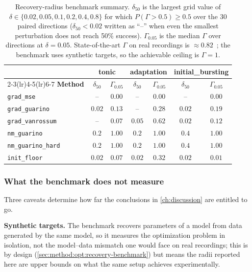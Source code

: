\begin{table}[t]
\centering
\caption{Recovery-radius benchmark summary. $\delta_{50}$ is the largest grid value of $\delta\in\{0.02,0.05,0.1,0.2,0.4,0.8\}$ for which $P(\Gamma>0.5)\geq 0.5$ over the 30 paired directions ($\delta_{50} < 0.02$ written as ``--'' when even the smallest perturbation does not reach 50\% success). $\Gamma_{0.05}$ is the median $\Gamma$ over directions at $\delta=0.05$. State-of-the-art $\Gamma$ on real recordings is $\approx 0.82$~\cite{Jolivet2008}; the benchmark uses synthetic targets, so the achievable ceiling is $\Gamma=1$.}
\label{tab:results-summary}
\small
\begin{tabular}{lcccccc}
\toprule
& \multicolumn{2}{c}{\textbf{tonic}} & \multicolumn{2}{c}{\textbf{adaptation}} & \multicolumn{2}{c}{\textbf{initial\_bursting}} \\
\cmidrule(lr){2-3}\cmidrule(lr){4-5}\cmidrule(lr){6-7}
\textbf{Method} & $\delta_{50}$ & $\Gamma_{0.05}$ & $\delta_{50}$ & $\Gamma_{0.05}$ & $\delta_{50}$ & $\Gamma_{0.05}$ \\
\midrule
\texttt{grad\_mse}         & --     & $0.00$ & --     & $0.00$ & --     & $0.00$ \\
\texttt{grad\_guarino}     & $0.02$ & $0.13$ & --     & $0.28$ & $0.02$ & $0.19$ \\
\texttt{grad\_vanrossum}   & --     & $0.07$ & $0.05$ & $0.62$ & $0.02$ & $0.12$ \\
\texttt{nm\_guarino}       & $0.2$  & $1.00$ & $0.2$  & $1.00$ & $0.4$  & $1.00$ \\
\texttt{nm\_guarino\_hard} & $0.2$  & $1.00$ & $0.2$  & $1.00$ & $0.4$  & $1.00$ \\
\midrule
\texttt{init\_floor}       & $0.02$ & $0.07$ & $0.02$ & $0.32$ & $0.02$ & $0.01$ \\
\bottomrule
\end{tabular}
\end{table}

\subsubsection{What the benchmark does not measure}
Three caveats determine how far the conclusions in \cref{ch:discussion} are entitled to go.

\textbf{Synthetic targets.} The benchmark recovers parameters of a model from data generated by the same model, so it measures the optimization problem in isolation, not the model--data mismatch one would face on real recordings; this is by design (\cref{sec:method:opt:recovery-benchmark}) but means the radii reported here are upper bounds on what the same setup achieves experimentally.


